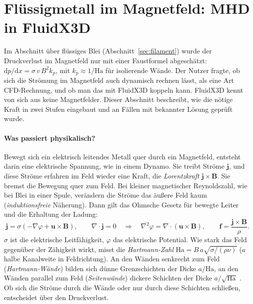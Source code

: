 \section{Flüssigmetall im Magnetfeld: MHD in FluidX3D}\label{sec:mhd}

Im Abschnitt über flüssiges Blei (Abschnitt~\ref{sec:filament}) wurde der Druckverlust im Magnetfeld nur mit
einer Faustformel abgeschätzt: $\mathrm{d}p/\mathrm{d}x = \sigma\,v\,B^2 k_p$, mit $k_p \approx 1/\mathrm{Ha}$ für
isolierende Wände. Der Nutzer fragte, ob sich die Strömung im Magnetfeld auch dynamisch rechnen lässt, als eine Art
CFD-Rechnung, und ob man das mit FluidX3D koppeln kann. FluidX3D kennt von sich aus keine Magnetfelder. Dieser
Abschnitt beschreibt, wie die nötige Kraft in zwei Stufen eingebaut und an Fällen mit bekannter Lösung geprüft wurde.

\paragraph{Was passiert physikalisch?} Bewegt sich ein elektrisch leitendes Metall quer durch ein Magnetfeld,
entsteht darin eine elektrische Spannung, wie in einem Dynamo. Sie treibt Ströme $\mathbf{j}$, und diese Ströme
erfahren im Feld wieder eine Kraft, die \emph{Lorentzkraft} $\mathbf{j}\times\mathbf{B}$. Sie bremst die Bewegung
quer zum Feld. Bei kleiner magnetischer Reynoldszahl, wie bei Blei in einer Spule, verändern die Ströme das äußere
Feld kaum (\emph{induktionsfreie} Näherung). Dann gilt das Ohmsche Gesetz für bewegte Leiter und die Erhaltung der
Ladung:
\[
\mathbf{j} = \sigma\left(-\nabla\varphi + \mathbf{u}\times\mathbf{B}\right),\qquad \nabla\cdot\mathbf{j} = 0
\quad\Rightarrow\quad \nabla^2\varphi = \nabla\cdot(\mathbf{u}\times\mathbf{B}),\qquad
\mathbf{f} = \frac{\mathbf{j}\times\mathbf{B}}{\rho}.
\]
$\sigma$ ist die elektrische Leitfähigkeit, $\varphi$ das elektrische Potential. Wie stark das Feld gegenüber der
Zähigkeit wirkt, misst die \emph{Hartmann-Zahl} $\mathrm{Ha} = B\,a\sqrt{\sigma/(\rho\nu)}$ ($a$ halbe Kanalweite in
Feldrichtung). An den Wänden senkrecht zum Feld (\emph{Hartmann-Wände}) bilden sich dünne Grenzschichten der Dicke
$a/\mathrm{Ha}$, an den Wänden parallel zum Feld (\emph{Seitenwände}) dickere Schichten der Dicke $a/\sqrt{\mathrm{Ha}}$
\cite{huntshercliff1971}. Ob sich die Ströme durch die Wände oder nur durch diese Schichten schließen, entscheidet über
den Druckverlust.

